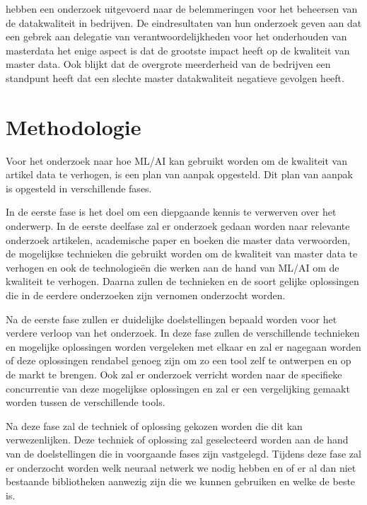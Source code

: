 \textcite{ Haug2011a} hebben een onderzoek uitgevoerd naar de belemmeringen voor het beheersen van de datakwaliteit in bedrijven. De eindresultaten van hun onderzoek geven aan dat een gebrek aan delegatie van verantwoordelijkheden voor het onderhouden van masterdata het enige aspect is dat de grootste impact heeft op de kwaliteit van master data. Ook blijkt dat de overgrote meerderheid van de bedrijven een standpunt heeft dat een slechte master datakwaliteit negatieve gevolgen heeft. 

\section{Methodologie}%
\label{sec:methodologie}

Voor het onderzoek naar hoe ML/AI kan gebruikt worden om de kwaliteit van artikel data te verhogen, is een plan van aanpak opgesteld. Dit plan van aanpak is opgesteld in verschillende fases. 

In de eerste fase is het doel om een diepgaande kennis te verwerven over het onderwerp. In de eerste deelfase zal er onderzoek gedaan worden naar relevante onderzoek artikelen, academische paper en boeken die master data verwoorden, de mogelijkse technieken die gebruikt worden om de kwaliteit van master data te verhogen en ook de technologieën die werken aan de hand van ML/AI om de kwaliteit te verhogen. Daarna zullen de technieken en de soort gelijke oplossingen die in de eerdere onderzoeken zijn vernomen onderzocht worden. 

Na de eerste fase zullen er duidelijke doelstellingen bepaald worden voor het verdere verloop van het onderzoek. In deze fase zullen de verschillende technieken en mogelijke oplossingen worden vergeleken met elkaar en zal er nagegaan worden of deze oplossingen rendabel genoeg zijn om zo een tool zelf te ontwerpen en op de markt te brengen. Ook zal er onderzoek verricht worden naar de specifieke concurrentie van deze mogelijkse oplossingen en zal er een vergelijking gemaakt worden tussen de verschillende tools. 

Na deze fase zal de techniek of oplossing gekozen worden die dit kan verwezenlijken. Deze techniek of oplossing zal geselecteerd worden aan de hand van de doelstellingen die in voorgaande fases zijn vastgelegd. Tijdens deze fase zal er onderzocht worden welk neuraal netwerk we nodig hebben en of er al dan niet bestaande bibliotheken aanwezig zijn die we kunnen gebruiken en welke de beste is. 

